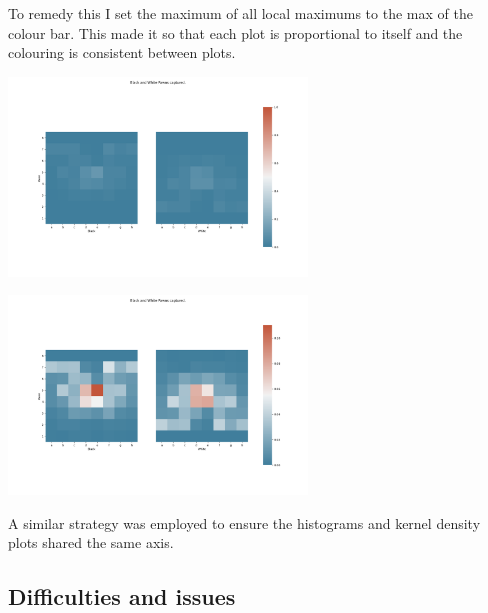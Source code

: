 \documentclass[11pt]{article}
\begin{document}
To remedy this I set the maximum of all local maximums to the max of the colour bar. This made it so that each plot is proportional to itself and the colouring is consistent between plots.
\begin{center}
\includegraphics[width=300]{images/DaenaliaEvandruile_HEATMAP_Pawn_WHITE_EXAMPLE_1_WITH_WRONG_COLOUR.png}
\end{center}

\begin{center}
\includegraphics[width=300]{images/DaenaliaEvandruile_HEATMAP_Pawn.png}
\end{center}

A similar strategy was employed to ensure the histograms and kernel density plots shared the same axis.

\subsection{Difficulties and issues}
\label{sec:orgdf6e5f4}
\end{document}
